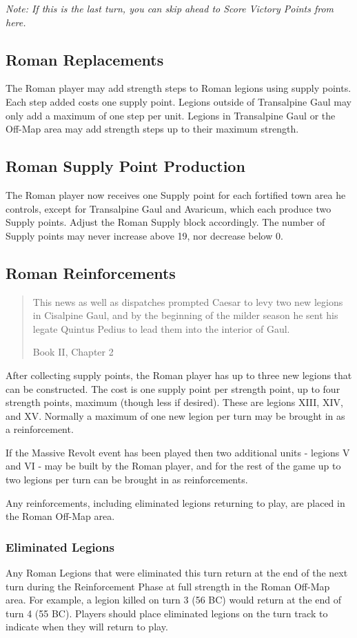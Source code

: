 \textit{Note: If this is the last turn, you can skip ahead to Score Victory Points from here.}

\subsection{Roman Replacements}
\par
The Roman player may add strength steps to Roman legions using supply points. Each step added costs one supply point. Legions outside of Transalpine Gaul may only add a maximum of one step per unit. Legions in Transalpine Gaul or the Off-Map area may add strength steps up to their maximum strength.

\subsection{Roman Supply Point Production}
\par
The Roman player now receives one Supply point for each fortified town area he controls, except for Transalpine Gaul and Avaricum, which each produce two Supply points. Adjust the Roman Supply block accordingly. The number of Supply points may never increase above 19, nor decrease below 0.

\subsection{Roman Reinforcements}\label{roman_reinforcements}
\blockquote[Book II, Chapter 2]{This news as well as dispatches prompted Caesar to levy two new legions in Cisalpine Gaul, and by the beginning of the milder season he sent his legate Quintus Pedius to lead them into the interior of Gaul.}
\par
After collecting supply points, the Roman player has up to three new legions that can be constructed. The cost is one supply point per strength point, up to four strength points, maximum (though less if desired). These are legions XIII, XIV, and XV. Normally a maximum of one new legion per turn may be brought in as a reinforcement.

If the Massive Revolt event has been played then two additional units - legions V and VI - may be built by the Roman player, and for the rest of the game up to two legions per turn can be brought in as reinforcements.

Any reinforcements, including eliminated legions returning to play, are placed in the Roman Off-Map area.

\subsubsection{Eliminated Legions}
\par
Any Roman Legions that were eliminated this turn return at the end of the next turn during the Reinforcement Phase at full strength in the Roman Off-Map area. For example, a legion killed on turn 3 (56 BC) would return at the end of turn 4 (55 BC). Players should place eliminated legions on the turn track to indicate when they will return to play.

